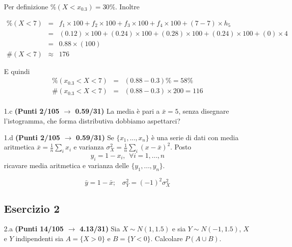 \documentclass[
  11pt,
]{book}
\theoremstyle{mytheoremstyle}
\theoremstyle{mydefstyle}
\newenvironment{sol}
  {
  \begin{tcolorbox}[enhanced,breakable,arc=0.1mm,boxrule=1pt,colback=white,colframe=iblue,
  title=\bf \fontfamily{lmss}\selectfont \hspace{.5 cm} Soluzione,drop fuzzy shadow]

}{
\end{tcolorbox}
  }
\begin{document}
\begin{sol}
Per definizione \(\%(X<x_{ 0.3 })= 30 \%\). Inoltre

\begin{eqnarray*}
   \%(X< 7 ) &=&  f_{ 1 }\times 100+f_{ 2 }\times 100+f_{ 3 }\times 100+f_{ 4 }\times 100 +( 7 - 7 )\times h_{ 5 } \\
                &=&  ( 0.12 )\times 100+( 0.24 )\times 100+( 0.28 )\times 100+( 0.24 )\times 100 +( 0 )\times  4  \\
                &=&  0.88 \times(100) \\
\#(X< 7 )    &\approx& 176 
\end{eqnarray*}

E quindi
\begin{eqnarray*}
   \%( x_{0.3} < X < 7 ) &=& ( 0.88 - 0.3 )\%= 58 \% \\
   \#( x_{0.3} < X < 7 ) &=& ( 0.88 - 0.3 )\times  200 = 116  \\
\end{eqnarray*}

\end{sol}

1.c \textbf{(Punti 2/105 \(\rightarrow\) 0.59/31)} La media è pari a \(\bar x=5\), senza disegnare l'istogramma, che forma distributiva dobbiamo aspettarci?

1.d \textbf{(Punti 2/105 \(\rightarrow\) 0.59/31)} Se \(\{x_1,...,x_n\}\) è una serie di dati con media aritmetica \(\bar x=\frac 1n\sum_i x_i\) e varianza \(\sigma_X^2=\frac 1n\sum_i(x-\bar x)^2\). Posto
\[
y_i = 1-x_i,~~\forall i=1,...,n
\]
ricavare media aritmetica e varianza delle \(\{y_1,...,y_n\}\).

\begin{sol}
\[
\bar y = 1-\bar x;~~~~\sigma_Y^2=(-1)^2\sigma_X^2
\]

\end{sol}

\subsection{Esercizio 2}\label{esercizio-2-42}

2.a \textbf{(Punti 14/105 \(\rightarrow\) 4.13/31)} Sia \(X\sim N(1,1.5)\) e sia \(Y\sim N(-1,1.5)\), \(X\) e \(Y\) indipendenti sia \(A=\{X>0\}\) e \(B=\{Y<0\}\).
Calcolare \(P(A\cup B)\).
\end{document}
